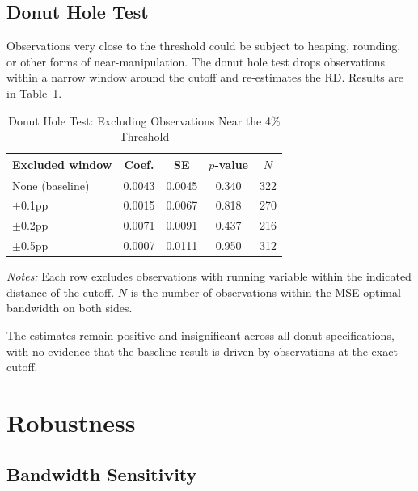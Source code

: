 \documentclass[12pt, a4paper]{article}
\begin{document}
\subsection{Donut Hole Test}

Observations very close to the threshold could be subject to heaping, rounding, or other forms of near-manipulation. The donut hole test drops observations within a narrow window around the cutoff and re-estimates the RD. Results are in Table~\ref{tab:donut}.

\begin{table}[H]
\centering
\caption{Donut Hole Test: Excluding Observations Near the 4\% Threshold}
\label{tab:donut}
\begin{tabular}{lcccc}
\toprule
\textbf{Excluded window} & \textbf{Coef.} & \textbf{SE} & \textbf{$p$-value} & \textbf{$N$} \\
\midrule
None (baseline) & 0.0043 & 0.0045 & 0.340 & 322 \\
$\pm$0.1pp & 0.0015 & 0.0067 & 0.818 & 270 \\
$\pm$0.2pp & 0.0071 & 0.0091 & 0.437 & 216 \\
$\pm$0.5pp & 0.0007 & 0.0111 & 0.950 & 312 \\
\bottomrule
\end{tabular}
\begin{minipage}{\textwidth}
\vspace{0.3em}
\footnotesize
\textit{Notes:} Each row excludes observations with running variable within the indicated distance of the cutoff. $N$ is the number of observations within the MSE-optimal bandwidth on both sides.
\end{minipage}
\end{table}

The estimates remain positive and insignificant across all donut specifications, with no evidence that the baseline result is driven by observations at the exact cutoff.

\section{Robustness}
\label{sec:robustness}

\subsection{Bandwidth Sensitivity}
\end{document}
